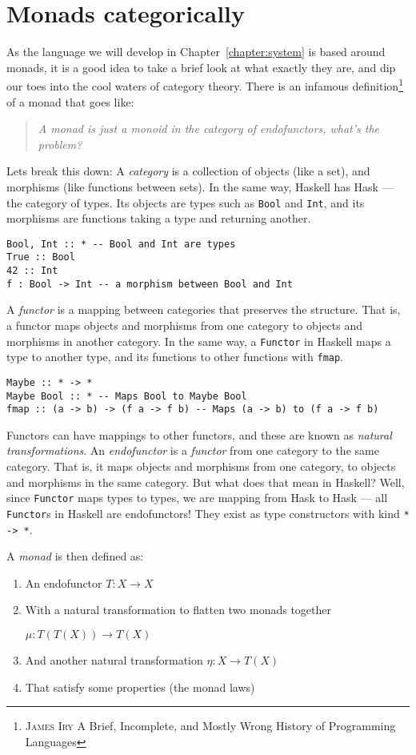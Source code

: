 \section{Monads categorically}
As the language we will develop in Chapter~\ref{chapter:system} is
based around monads, it is a good idea to take a brief look at what
exactly they are, and dip our toes into the cool waters of category
theory. There is an infamous definition\footnote{\textsc{James Iry} A Brief, Incomplete, and Mostly Wrong History of Programming Languages} of a monad that goes like:
\begin{quote}
  \textsl{A monad is just a monoid in the category of endofunctors,
    what's the problem?}
\end{quote}
Lets break this down: A \textit{category} is a collection of objects
(like a set), and morphisms (like functions between sets). In the same
way, Haskell has \textsf{Hask} --- the category of types. Its objects
are types such as \texttt{Bool} and
\texttt{Int}, and its morphisms are functions taking a
type and returning another.
\begin{verbatim}
Bool, Int :: * -- Bool and Int are types
True :: Bool
42 :: Int
f : Bool -> Int -- a morphism between Bool and Int
\end{verbatim}
A \textit{functor} is a mapping between categories that
preserves the structure. That is, a functor maps objects and morphisms
from one category to objects and morphisms in another category.
In the same way, a \texttt{Functor} in Haskell maps a
type to another type, and its functions to other functions with
\texttt{fmap}. 
\begin{verbatim}
Maybe :: * -> *
Maybe Bool :: * -- Maps Bool to Maybe Bool
fmap :: (a -> b) -> (f a -> f b) -- Maps (a -> b) to (f a -> f b)
\end{verbatim}
Functors can have mappings to other functors, and these are known as
\emph{natural transformations}.
An \textit{endofunctor} is a \textit{functor} from one category to the
same category. That is, it maps objects and morphisms from one
category, to objects and morphisms in the same category. But what does
that mean in Haskell? Well, since \texttt{Functor} maps
types to types, we are mapping from \textsf{Hask} to \textsf{Hask} ---
all \texttt{Functor}s in Haskell are endofunctors! They
exist as type constructors with kind \texttt{* -> *}.

A \textit{monad} is then defined as:
\begin{enumerate}
\item An endofunctor $T : X \rightarrow X$
\item With a natural transformation to flatten two monads together

${\mu : T(T(X)) \rightarrow T(X)}$
\item And another natural transformation $\eta : X \rightarrow T(X)$
\item That satisfy some properties (the monad laws)
\end{enumerate}

